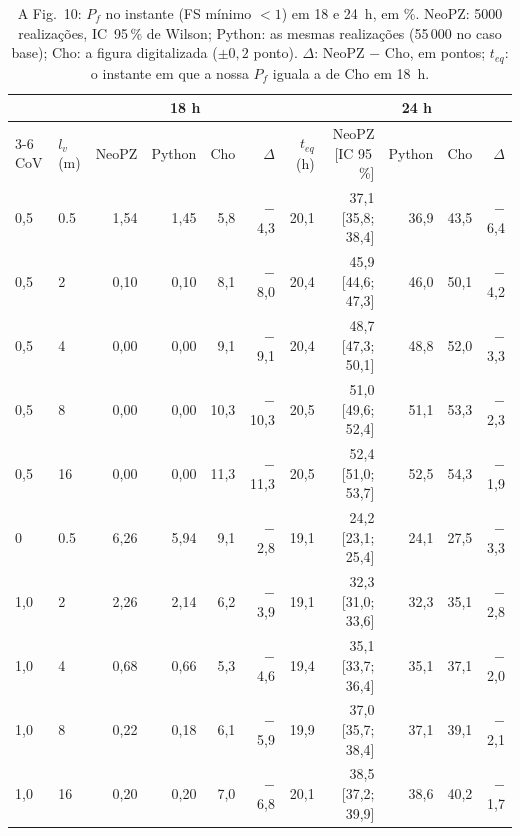 \begin{table}[htbp]\centering\footnotesize\setlength{\tabcolsep}{3.5pt}
\caption{A Fig.~10: $P_f$ no instante (FS mínimo $< 1$) em 18 e 24~h, em \%. NeoPZ: 5000 realizações, IC~95\,\% de Wilson; Python: as mesmas realizações (55\,000 no caso base); Cho: a figura digitalizada ($\pm 0{,}2$ ponto). $\Delta$: NeoPZ $-$ Cho, em pontos; $t_{eq}$: o instante em que a nossa $P_f$ iguala a de Cho em 18~h.}\label{tab:fig10}
\begin{tabular}{llrrrrrrrrr}\toprule
& & \multicolumn{4}{c}{18 h} & & \multicolumn{4}{c}{24 h} \\\cmidrule{3-6}\cmidrule{8-11}
CoV & $l_v$ (m) & NeoPZ & Python & Cho & $\Delta$ & $t_{eq}$ (h) & NeoPZ [IC 95\,\%] & Python & Cho & $\Delta$ \\\midrule
0{,}5 & 0.5 & 1{,}54 & 1{,}45 & 5{,}8 & \ensuremath{-}4{,}3 & 20{,}1 & 37{,}1 [35{,}8; 38{,}4] & 36{,}9 & 43{,}5 & \ensuremath{-}6{,}4 \\
0{,}5 & 2 & 0{,}10 & 0{,}10 & 8{,}1 & \ensuremath{-}8{,}0 & 20{,}4 & 45{,}9 [44{,}6; 47{,}3] & 46{,}0 & 50{,}1 & \ensuremath{-}4{,}2 \\
0{,}5 & 4 & 0{,}00 & 0{,}00 & 9{,}1 & \ensuremath{-}9{,}1 & 20{,}4 & 48{,}7 [47{,}3; 50{,}1] & 48{,}8 & 52{,}0 & \ensuremath{-}3{,}3 \\
0{,}5 & 8 & 0{,}00 & 0{,}00 & 10{,}3 & \ensuremath{-}10{,}3 & 20{,}5 & 51{,}0 [49{,}6; 52{,}4] & 51{,}1 & 53{,}3 & \ensuremath{-}2{,}3 \\
0{,}5 & 16 & 0{,}00 & 0{,}00 & 11{,}3 & \ensuremath{-}11{,}3 & 20{,}5 & 52{,}4 [51{,}0; 53{,}7] & 52{,}5 & 54{,}3 & \ensuremath{-}1{,}9 \\
\addlinespace
1{,}0 & 0.5 & 6{,}26 & 5{,}94 & 9{,}1 & \ensuremath{-}2{,}8 & 19{,}1 & 24{,}2 [23{,}1; 25{,}4] & 24{,}1 & 27{,}5 & \ensuremath{-}3{,}3 \\
1{,}0 & 2 & 2{,}26 & 2{,}14 & 6{,}2 & \ensuremath{-}3{,}9 & 19{,}1 & 32{,}3 [31{,}0; 33{,}6] & 32{,}3 & 35{,}1 & \ensuremath{-}2{,}8 \\
1{,}0 & 4 & 0{,}68 & 0{,}66 & 5{,}3 & \ensuremath{-}4{,}6 & 19{,}4 & 35{,}1 [33{,}7; 36{,}4] & 35{,}1 & 37{,}1 & \ensuremath{-}2{,}0 \\
1{,}0 & 8 & 0{,}22 & 0{,}18 & 6{,}1 & \ensuremath{-}5{,}9 & 19{,}9 & 37{,}0 [35{,}7; 38{,}4] & 37{,}1 & 39{,}1 & \ensuremath{-}2{,}1 \\
1{,}0 & 16 & 0{,}20 & 0{,}20 & 7{,}0 & \ensuremath{-}6{,}8 & 20{,}1 & 38{,}5 [37{,}2; 39{,}9] & 38{,}6 & 40{,}2 & \ensuremath{-}1{,}7 \\

\end{tabular}
\end{table}
